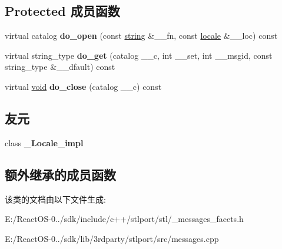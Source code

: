 \subsection*{Protected 成员函数}
\begin{DoxyCompactItemize}
\item 
\mbox{\label{classmessages__byname_3_01wchar__t_01_4_a76d7969f546d747e46d142992e3085bc}} 
virtual catalog {\bfseries do\+\_\+open} (const \hyperlink{structstring}{string} \&\+\_\+\+\_\+fn, const \hyperlink{classlocale}{locale} \&\+\_\+\+\_\+loc) const
\item 
\mbox{\label{classmessages__byname_3_01wchar__t_01_4_a49400c4fc52b579318c5cf6078e1a1b1}} 
virtual string\+\_\+type {\bfseries do\+\_\+get} (catalog \+\_\+\+\_\+c, int \+\_\+\+\_\+set, int \+\_\+\+\_\+msgid, const string\+\_\+type \&\+\_\+\+\_\+dfault) const
\item 
\mbox{\label{classmessages__byname_3_01wchar__t_01_4_a0bcf981a1c87320c4dabe764943b0824}} 
virtual \hyperlink{interfacevoid}{void} {\bfseries do\+\_\+close} (catalog \+\_\+\+\_\+c) const
\end{DoxyCompactItemize}
\subsection*{友元}
\begin{DoxyCompactItemize}
\item 
\mbox{\label{classmessages__byname_3_01wchar__t_01_4_ae9c09ac7cd16ad35f8fdb1587ac77eb8}} 
class {\bfseries \+\_\+\+Locale\+\_\+impl}
\end{DoxyCompactItemize}
\subsection*{额外继承的成员函数}


该类的文档由以下文件生成\+:\begin{DoxyCompactItemize}
\item 
E\+:/\+React\+O\+S-\/0../sdk/include/c++/stlport/stl/\+\_\+messages\+\_\+facets.\+h\item 
E\+:/\+React\+O\+S-\/0../sdk/lib/3rdparty/stlport/src/messages.\+cpp\end{DoxyCompactItemize}
